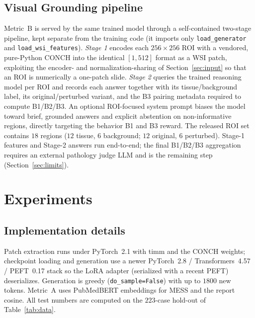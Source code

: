 \documentclass[11pt]{article}
\newcommand{\code}[1]{\texttt{\small #1}}
\begin{document}
\subsection{Visual Grounding pipeline}
\label{sec:grounding}
Metric~B is served by the same trained model through a self-contained two-stage
pipeline, kept separate from the training code (it imports only
\code{load\_generator} and \code{load\_wsi\_features}). \emph{Stage 1} encodes
each $256{\times}256$ ROI with a vendored, pure-Python CONCH into the identical
$[1,512]$ format as a WSI patch, exploiting the encoder- and normalization-sharing
of Section~\ref{sec:input} so that an ROI is numerically a one-patch slide.
\emph{Stage 2} queries the trained reasoning model per ROI and records each answer
together with its tissue/background label, its original/perturbed variant, and the
B3 pairing metadata required to compute B1/B2/B3. An optional ROI-focused system
prompt biases the model toward brief, grounded answers and explicit abstention on
non-informative regions, directly targeting the behavior B1 and B3 reward. The
released ROI set contains $18$ regions ($12$ tissue, $6$ background; $12$ original,
$6$ perturbed). Stage-1 features and Stage-2 answers run end-to-end; the final
B1/B2/B3 aggregation requires an external pathology judge LLM and is the remaining
step (Section~\ref{sec:limits}).

\section{Experiments}
\label{sec:results}
\subsection{Implementation details}
Patch extraction runs under PyTorch~2.1 with timm and the CONCH weights;
checkpoint loading and generation use a newer PyTorch~2.8 / Transformers~4.57 /
PEFT~0.17 stack so the LoRA adapter (serialized with a recent PEFT) deserializes.
Generation is greedy (\code{do\_sample=False}) with up to $1800$ new tokens.
Metric~A uses PubMedBERT embeddings for MESS and the report cosine. All test
numbers are computed on the $223$-case hold-out of Table~\ref{tab:data}.
\end{document}
